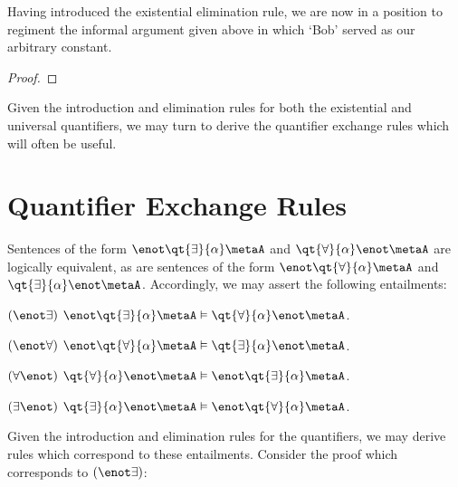 Having introduced the existential elimination rule, we are now in a position to regiment the informal argument given above in which `Bob' served as our arbitrary constant.

\begin{proof}
	 \pr{}
	 \pr{} 
	\open
		\as{}
		 
	\close
\end{proof}

Given the introduction and elimination rules for both the existential and universal quantifiers, we may turn to derive the quantifier exchange rules which will often be useful.




\section{Quantifier Exchange Rules}
  \label{QER}

Sentences of the form $\enot\qt{\exists}{\alpha}\metaA$ and $\qt{\forall}{\alpha}\enot\metaA$ are logically equivalent, as are sentences of the form $\enot\qt{\forall}{\alpha}\metaA$ and $\qt{\exists}{\alpha}\enot\metaA$.
Accordingly, we may assert the following entailments: 

\vspace{.1in}
\begin{enumerate}[leftmargin=.75in]
  \begin{multicols}{2}
    \item[$(\enot\exists)$] $\enot\qt{\exists}{\alpha}\metaA \vDash \qt{\forall}{\alpha}\enot\metaA$.
    \item[$(\enot\forall)$] $\enot\qt{\forall}{\alpha}\metaA \vDash \qt{\exists}{\alpha}\enot\metaA$.
    \item[$(\forall\enot)$] $\qt{\forall}{\alpha}\enot\metaA \vDash \enot\qt{\exists}{\alpha}\metaA$.
    \item[$(\exists\enot)$] $\qt{\exists}{\alpha}\enot\metaA \vDash \enot\qt{\forall}{\alpha}\metaA$.
  \end{multicols}
\end{enumerate}
\vspace{-.05in}

Given the introduction and elimination rules for the quantifiers, we may derive rules which correspond to these entailments.
Consider the proof which corresponds to $(\enot\exists)$:

